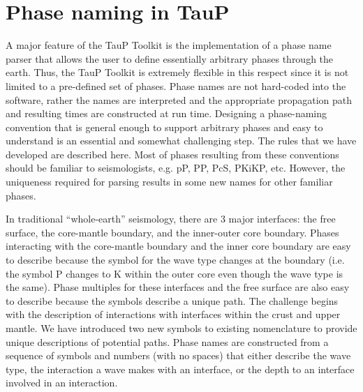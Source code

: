 

\section{Phase naming in TauP} \label{phasenaming}


A major feature of the TauP Toolkit is the implementation of a phase name parser
that allows the user to define essentially arbitrary phases through the earth.
Thus, the TauP Toolkit is extremely flexible in this respect since it is
not limited to a pre-defined set of phases.  
Phase names are not hard-coded into the software, rather the names are interpreted
and the appropriate propagation path and resulting times are constructed at run time.
Designing a phase-naming convention that is general enough to support arbitrary phases
and easy to understand is an essential and somewhat challenging step.
The rules that we have developed are described here.
Most of phases resulting from these conventions should 
be familiar to seismologists, e.g. pP, PP, PcS, PKiKP, etc. 
However, the uniqueness required for parsing results in some new names for other
familiar phases.

In traditional ``whole-earth'' seismology, there are 3 major interfaces:  the free
surface, the core-mantle boundary, and the inner-outer core boundary.  
Phases interacting with the core-mantle boundary and the inner core boundary are easy to
describe because the symbol for the wave type changes at the boundary (i.e. the symbol P
changes to K within the outer core even though the wave type is the same).
Phase multiples for these interfaces and the free surface are also easy to describe because 
the symbols describe a unique path.  
The challenge begins with the description of interactions with interfaces within the
crust and upper mantle.  
We have introduced two new symbols to existing
nomenclature to provide unique descriptions of potential paths.
Phase names are constructed from a sequence of symbols and numbers (with no spaces) 
that either describe the wave type, the interaction a wave makes with an interface, or
the depth to an interface involved in an interaction.


